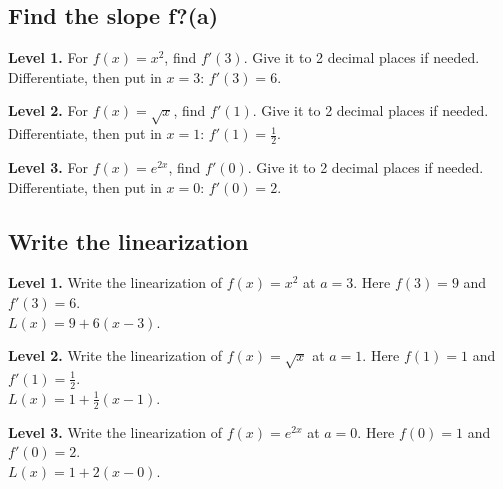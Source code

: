 \documentclass[11pt]{article}
\begin{document}
\subsection*{Find the slope f?(a)}
\noindent\textbf{Level 1.} For $f(x)=x^2$, find $f'(3)$. Give it to 2 decimal places if needed.\\  \quad Differentiate, then put in $x=3$: $f'(3)=6$.\par\medskip
\noindent\textbf{Level 2.} For $f(x)=\sqrt{x}$, find $f'(1)$. Give it to 2 decimal places if needed.\\  \quad Differentiate, then put in $x=1$: $f'(1)=\tfrac{1}{2}$.\par\medskip
\noindent\textbf{Level 3.} For $f(x)=e^{2x}$, find $f'(0)$. Give it to 2 decimal places if needed.\\  \quad Differentiate, then put in $x=0$: $f'(0)=2$.\par\medskip
\subsection*{Write the linearization}
\noindent\textbf{Level 1.} Write the linearization of $f(x)=x^2$ at $a=3$. Here $f(3)=9$ and $f'(3)=6$.\\  \quad $L(x)=9+6(x-3)$.\par\medskip
\noindent\textbf{Level 2.} Write the linearization of $f(x)=\sqrt{x}$ at $a=1$. Here $f(1)=1$ and $f'(1)=\tfrac{1}{2}$.\\  \quad $L(x)=1+\tfrac{1}{2}(x-1)$.\par\medskip
\noindent\textbf{Level 3.} Write the linearization of $f(x)=e^{2x}$ at $a=0$. Here $f(0)=1$ and $f'(0)=2$.\\  \quad $L(x)=1+2(x-0)$.\par\medskip
\end{document}
